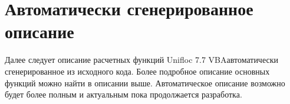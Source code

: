 \documentclass[a4paper,14pt,oneside,openany]{memoir}
\newcommand{\unf}{Unifloc 7.7 VBA}
\begin{document}
	

	
\appendix
\setlength{\midchapskip}{20pt}
\renewcommand*{\afterchapternum}{\par\nobreak\vskip \midchapskip}
\renewcommand\thechapter{\Asbuk{chapter}} %
	
	

\chapter{Автоматически сгенерированное описание}

Далее следует описание расчетных функций \unf автоматически сгенерированное из исходного кода.
Более подробное описание основных функций можно найти в описании выше. Автоматическое описание возможно будет более полным и актуальным пока продолжается разработка.


	
\end{document}
